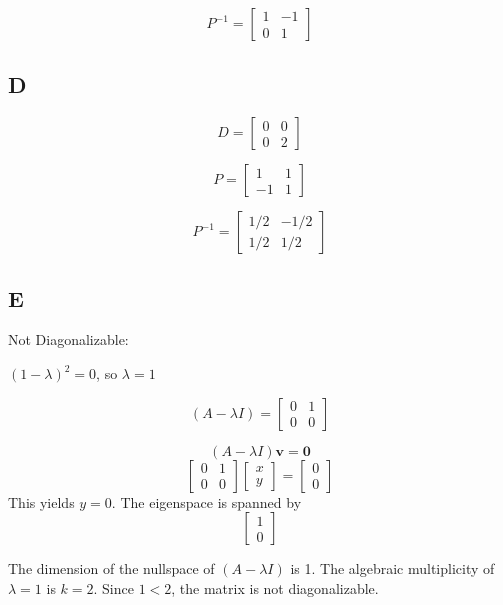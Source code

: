 \documentclass{article}
\begin{document}
\[P^{-1} = \begin{bmatrix} 1 & -1 \\ 0 & 1 \end{bmatrix}\]

\subsection*{D}

\[D = \begin{bmatrix} 0 & 0 \\ 0 & 2 \end{bmatrix}\]

\[P = \begin{bmatrix} 1 & 1 \\ -1 & 1 \end{bmatrix}\]

\[P^{-1} = \begin{bmatrix} 1/2 & -1/2 \\ 1/2 & 1/2 \end{bmatrix}\]

\subsection*{E}


Not Diagonalizable:

$(1-\lambda)^2 = 0$, so $\lambda = 1$

\[(A - \lambda I) = \begin{bmatrix} 0 & 1 \\ 0 & 0 \end{bmatrix}\]

\[(A - \lambda I)\mathbf{v} = \mathbf{0}\]
\[\begin{bmatrix} 0 & 1 \\ 0 & 0 \end{bmatrix} \begin{bmatrix} x \\ y \end{bmatrix} = \begin{bmatrix} 0 \\ 0 \end{bmatrix}\]  This yields $y = 0$.  The eigenspace is spanned by \[\begin{bmatrix} 1 \\ 0 \end{bmatrix}\]

The dimension of the nullspace of $(A - \lambda I)$ is 1.  The algebraic multiplicity of $\lambda = 1$ is $k=2$. Since $1 < 2$, the matrix is not diagonalizable.
\end{document}
